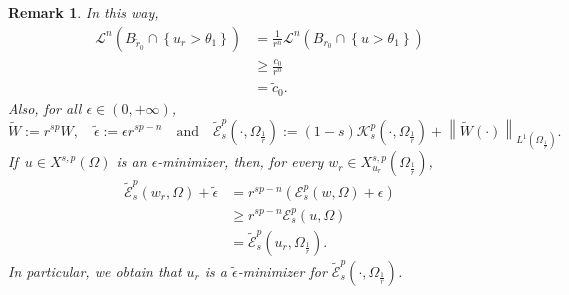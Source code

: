 \documentclass[12pt]{article}
\numberwithin{equation}{section}
\newtheorem{rem}[thm]{Remark}
\renewcommand{\geq}{\geqslant}
\begin{document}
\begin{rem}
{In this way,
\begin{equation}\label{efvecdere}
\begin{split}
\mathcal{L}^n\left(B_{\tilde{r}_0} \cap \left\lbrace u_r>\theta_1 \right\rbrace  \right)&=\frac{1}{r^n} \mathcal{L}^n\left(B_{r_0}\cap \left\lbrace u>\theta_1 \right\rbrace\right)\\
&\geq \frac{c_0}{r^n}\\
&=\tilde{c}_0.
\end{split}
\end{equation} 
Also, for all $\epsilon\in (0,+\infty)$,
\begin{equation*}
\tilde{W}:=r^{sp}W,\quad \tilde{\epsilon}:=\epsilon r^{sp-n}\quad \mbox{and}\quad \tilde{\mathcal{E}}_s^p\left(\cdot,\Omega_\frac{1}{r}\right):=(1-s)\mathcal{K}_s^p\left(\cdot,\Omega_\frac{1}{r}\right)+\left\|\tilde{W}\left(\cdot\right)\right\|_{L^1\left(\Omega_\frac{1}{r}\right)}.
\end{equation*}
If~$u\in X^{s,p}(\Omega)$ is an $\epsilon$-minimizer, then, for every $w_r\in X_{u_r}^{s,p}\left(\Omega_\frac{1}{r}\right)$,
\begin{equation}\label{lower-case}
\begin{split}
\tilde{\mathcal{E}}_s^p(w_r,\Omega)+\tilde{\epsilon}&=r^{sp-n} \left(\mathcal{E}_s^p(w,\Omega)+\epsilon \right)\\
&\geq r^{sp-n}\mathcal{E}_s^p(u,\Omega)\\
&=\tilde{\mathcal{E}}_s^p\left(u_r,\Omega_\frac{1}{r}\right).
\end{split}
\end{equation} 
In particular, we obtain that $u_r$ is a $\tilde{\epsilon}$-minimizer for $\tilde{\mathcal{E}}_s^p\left(\cdot,\Omega_\frac{1}{r}\right)$. 

}
\end{rem}
\end{document}
